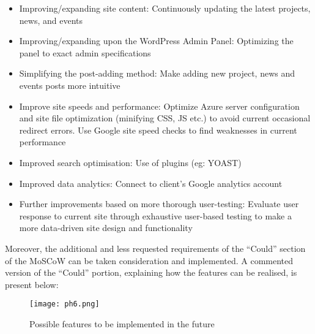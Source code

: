 \documentclass[fontsize=11pt]{extarticle}
\numberwithin{figure}{section} %
\providecommand{\tightlist}{%
  \setlength{\itemsep}{0pt}\setlength{\parskip}{0pt}}
\begin{document}
\begin{itemize}
\tightlist
\item
  Improving/expanding site content: Continuously updating the latest
  projects, news, and events
\item
  Improving/expanding upon the WordPress Admin Panel: Optimizing the
  panel to exact admin specifications
\item
  Simplifying the post-adding method: Make adding new project, news and
  events posts more intuitive
\item
  Improve site speeds and performance: Optimize Azure server
  configuration and site file optimization (minifying CSS, JS etc.) to
  avoid current occasional redirect errors. Use Google site speed checks
  to find weaknesses in current performance
\item
  Improved search optimisation: Use of plugins (eg: YOAST)
\item
  Improved data analytics: Connect to client's Google analytics account
\item
  Further improvements based on more thorough user-testing: Evaluate
  user response to current site through exhaustive user-based testing to
  make a more data-driven site design and functionality
\end{itemize}

Moreover, the additional and less requested requirements of the
``Could'' section of the MoSCoW can be taken consideration and
implemented. A commented version of the ``Could'' portion, explaining
how the features can be realised, is present below:

\begin{figure}[H]
      \centering
      \texttt{[image: ph6.png]}
      \caption{Possible features to be implemented in the future}
 \end{figure}
\newpage

% 
\end{document}
